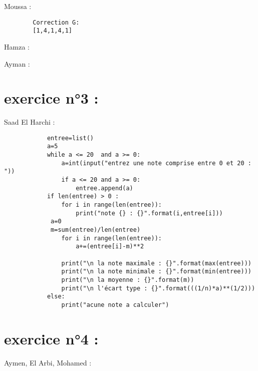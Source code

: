 \documentclass{article}
\begin{document}
    	\begin{center}
    		Moussa :
	\end{center} 
	
	\begin{verbatim}
		Correction G:
		[1,4,1,4,1]
	\end{verbatim}

    	\begin{center}
    		Hamza :
	\end{center} 


	\begin{center}
    		Ayman :
	\end{center} 
	
\section{exercice n°3 :}
        \begin{center}
    		Saad El Harchi :
	\end{center}    	  
        	
    	\begin{verbatim}
			entree=list()
			a=5
			while a <= 20  and a >= 0:
    			a=int(input("entrez une note comprise entre 0 et 20 : "))
    			if a <= 20 and a >= 0:
        			entree.append(a) 
			if len(entree) > 0 :
    			for i in range(len(entree)):
        			print("note {} : {}".format(i,entree[i]))
   			 a=0
   			 m=sum(entree)/len(entree)
    			for i in range(len(entree)):
        			a+=(entree[i]-m)**2
    
    			print("\n la note maximale : {}".format(max(entree)))
    			print("\n la note minimale : {}".format(min(entree)))
    			print("\n la moyenne : {}".format(m))
    			print("\n l'écart type : {}".format(((1/n)*a)**(1/2)))
			else:
    			print("acune note a calculer")
		\end{verbatim}

\section{exercice n°4 :}
	\begin{center}
    		Aymen, El Arbi, Mohamed :
	\end{center}
	\begin{verbatim}
		
	\end{verbatim}
\end{document}
